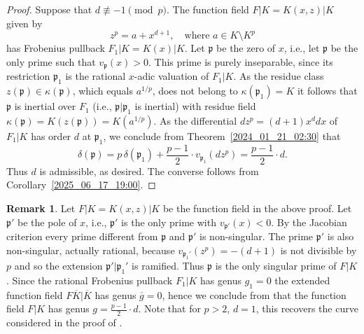 \documentclass[12pt,reqno]{amsart}%
\theoremstyle{definition}
\newtheorem{rem}[prop]{Remark}
\theoremstyle{remark}
\newcommand{\ov}{\overline}
\newcommand{\pp}{\mathfrak{p}}
\newcommand{\de}{\delta}
\newcommand{\ka}{\kappa}
\begin{document}
\begin{proof}
Suppose that $d\not\equiv -1 \pmod p$. 
The function field $F|K=K(x,z)|K$ given by 
\[ z^p = a + x^{d+1}, \quad \text{where $a\in K\setminus K^p$} \] 
has Frobenius pullback $F_1|K = K(x)|K$.
Let $\pp$ be the zero of $x$, i.e., let $\pp$ be the only prime such that $v_\pp(x)>0$.
This prime is purely inseparable, since its restriction $\pp_1$ is the rational $x$-adic valuation of $F_1|K$.
As the residue class $z(\pp)\in \ka(\pp)$, which equals $a^{1/p}$, does not belong to $\ka(\pp_1)=K$ it follows that $\pp$ is inertial over $F_1$ (i.e., $\pp|\pp_1$ is inertial) with residue field $\ka(\pp) = K(z(\pp)) = K(a^{1/p})$.
As the differential $dz^p = (d+1) x^d dx$ of $F_1|K$ has order $d$ at $\pp_1$, we conclude from Theorem~\ref{2024_01_21_02:30} that
\[ \de(\pp) = p\, \de(\pp_1) + \frac{p-1}2 \cdot v_{\pp_1}(dz^p) = \frac{p-1}2 \cdot d.   \]
Thus $d$ is admissible, as desired.
The converse follows from Corollary~\ref{2025_06_17_19:00}.
\end{proof}

\begin{rem}
Let $F|K=K(x,z)|K$ be the function field in the above proof.
Let $\pp'$ be the pole of $x$, i.e., $\pp'$ is the only prime with $v_{\pp'}(x)<0$.
By the Jacobian criterion every prime different from $\pp$ and $\pp'$ is non-singular.
The prime $\pp'$ is also non-singular, actually rational, because $v_{\pp_1'}(z^p)=-(d+1)$ is not divisible by $p$ and so the extension $\pp'|\pp_1'$ is ramified.
Thus $\pp$ is the only singular prime of $F|K$.
Since the rational Frobenius pullback $F_1|K$ has genus $g_1=0$ the extended function field $F\ov K | \ov K$ has genus $\ov g = 0$, hence we conclude from \cite[Formula~2.3]{HiSt22} that the function field $F|K$ has genus $g=\frac{p-1}2 {\cdot} d$.
Note that for $p>2$, $d=1$, this recovers the curve considered in the proof of \cite[Lemma~8.13]{IIL20}.

\end{rem}
\end{document}
